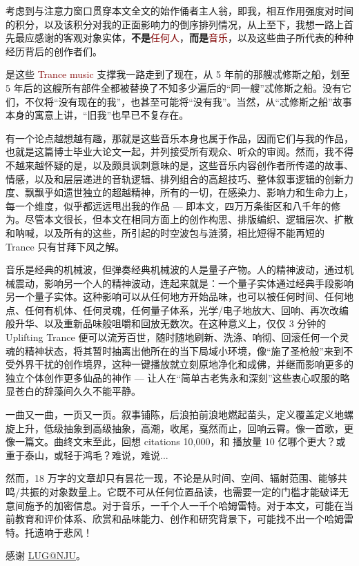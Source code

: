 \documentclass[
    type = doctor,
  ]{njuthesis}
\begin{document}
%
%


\begin{acknowledgement}
	考虑到与注意力窗口贯穿本文全文的始作俑者主人翁，即我，相互作用强度对时间的积分，以及该积分对我的正面影响力的倒序排列情况，从上至下，我想一路上首先最应感谢的客观对象实体，\textbf{不是}\textcolor{Maroon}{任何人}，\textbf{而是}\textcolor{Maroon}{音乐}，以及这些曲子所代表的种种经历背后的创作者们。
	
	是这些 \textcolor{Maroon}{Trance music} 支撑我一路走到了现在，从 5 年前的那艘忒修斯之船，划至 5 年后的这艘所有部件全都被替换了不知多少遍后的“同一艘”忒修斯之船。没有它们，不仅将“没有现在的我”，也甚至可能将“没有我”。当然，从“忒修斯之船”故事本身的寓意上讲，“旧我”也早已不复存在。
	
	有一个论点越想越有趣，那就是这些音乐本身也属于作品，因而它们与我的作品，也就是这篇博士毕业大论文一起，并列接受所有观众、听众的审阅。然而，我不得不越来越怀疑的是，以及颇具讽刺意味的是，这些音乐内容创作者所传递的故事、情感，以及和层层递进的音轨逻辑、排列组合的高超技巧、整体叙事逻辑的创新力度、飘飘乎如遗世独立的超越精神，所有的一切，在感染力、影响力和生命力上，每一个维度，似乎都远远甩出我的作品 --- 即本文，四万万条街区和八千年的修为。尽管本文很长，但本文在相同方面上的创作构思、排版编织、逻辑层次、扩散和呐喊，以及所有的这些，所引起的时空波包与涟漪，相比短得不能再短的 Trance 只有甘拜下风之解。
	
	音乐是经典的机械波，但弹奏经典机械波的人是量子产物。人的精神波动，通过机械震动，影响另一个人的精神波动，连起来就是：一个量子实体通过经典手段影响另一个量子实体。这种影响可以从任何地方开始品味，也可以被任何时间、任何地点、任何有机体、任何灵魂，任何量子体系，光学/电子地放大、回响、再次改编般升华、以及重新品味般咀嚼和回放无数次。在这种意义上，仅仅 3 分钟的 Uplifting Trance 便可以流芳百世，随时随地刷新、洗涤、响彻、回滚任何一个灵魂的精神状态，将其暂时抽离出他所在的当下局域小环境，像“施了圣枪般”来到不受外界干扰的创作境界，这种一键播放就立刻原地净化和成佛，并继而影响更多的独立个体创作更多仙品的神作 --- 让人在“简单古老隽永和深刻”这些衷心叹服的略显苍白的辞藻间久久不能平静。
	
	一曲又一曲，一页又一页。叙事铺陈，后浪拍前浪地燃起苗头，定义覆盖定义地螺旋上升，低级抽象到高级抽象，高潮，收尾，戛然而止，回响云霄。像一首歌，更像一篇文。曲终文末至此，回想 citations 10,000，和 播放量 10 亿哪个更大？或重于泰山，或轻于鸿毛？难说，难说...
	
	然而，18 万字的文章却只有昙花一现，不论是从时间、空间、辐射范围、能够共鸣/共振的对象数量上。它既不可从任何位置品读，也需要一定的门槛才能破译无意间施予的加密信息。对于音乐，一千个人一千个哈姆雷特。对于本文，可能在当前教育和评价体系、欣赏和品味能力、创作和研究背景下，可能找不出一个哈姆雷特。托遗响于悲风！
	
	
	感谢 \href{https://git.nju.edu.cn/nju-lug/lug-introduction}{LUG@NJU}。
\end{acknowledgement}

\end{document}
